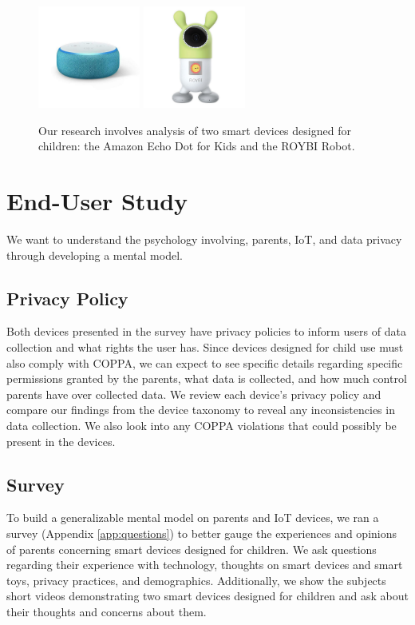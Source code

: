 \documentclass[12pt]{ucthesis}
\begin{document}
\begin{figure}
    \centering
    \includegraphics[width=0.3\textwidth]{echo.jpg}
    \includegraphics[width=0.3\textwidth]{ROYBI.jpg}
    \caption{Our research involves analysis of two smart devices designed for children: the Amazon Echo Dot for Kids and the ROYBI Robot.}
    \label{fig:devices}
\end{figure}

\section{End-User Study}
We want to understand the psychology involving, parents, IoT, and data privacy through developing a mental model.

\subsection{Privacy Policy}
Both devices presented in the survey have privacy policies to inform users of data collection and what rights the user has. Since devices designed for child use must also comply with COPPA, we can expect to see specific details regarding specific permissions granted by the parents, what data is collected, and how much control parents have over collected data. We review each device's privacy policy and compare our findings from the device taxonomy to reveal any inconsistencies in data collection. We also look into any COPPA violations that could possibly be present in the devices.

\subsection{Survey}
To build a generalizable mental model on parents and IoT devices, we ran a survey (Appendix \ref{app:questions}) to better gauge the experiences and opinions of parents concerning smart devices designed for children. We ask questions regarding their experience with technology, thoughts on smart devices and smart toys, privacy practices, and demographics. Additionally, we show the subjects short videos demonstrating two smart devices designed for children and ask about their thoughts and concerns about them. 
\end{document}
